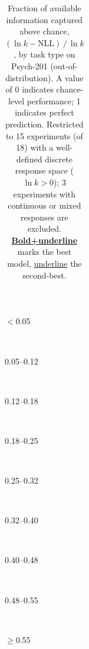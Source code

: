 \documentclass{article}
\begin{document}
\begin{table}[t]
{\begin{tabular}{@{}l   r r r r r   r r r   r r r r   r r   r r r   r@{}}
\end{tabular}%
}
\vspace{2pt}
{\tiny\centering
\colorbox{c9!35}{\strut\,} $<$0.05 ~
\colorbox{c8!40}{\strut\,} 0.05--0.12 ~
\colorbox{c7!45}{\strut\,} 0.12--0.18 ~
\colorbox{c6!50}{\strut\,} 0.18--0.25 ~
\colorbox{c5!55}{\strut\,} 0.25--0.32 ~
\colorbox{c4!45}{\strut\,} 0.32--0.40 ~
\colorbox{c3!40}{\strut\,} 0.40--0.48 ~
\colorbox{c2!40}{\strut\,} 0.48--0.55 ~
\colorbox{c1!45}{\strut\,} $\geq$0.55\par}
\caption{Fraction of available information captured above chance, $(\ln k - \mathrm{NLL}) \,/\, \ln k$, by task type on Psych-201 (out-of-distribution). A value of 0 indicates chance-level performance; 1 indicates perfect prediction. Restricted to 15 experiments (of 18) with a well-defined discrete response space ($\ln k > 0$); 3 experiments with continuous or mixed responses are excluded. \underline{\textbf{Bold+underline}} marks the best model, \underline{underline} the second-best.}
\label{tab:psych201_normalised}
\end{table}
\clearpage
\end{document}
